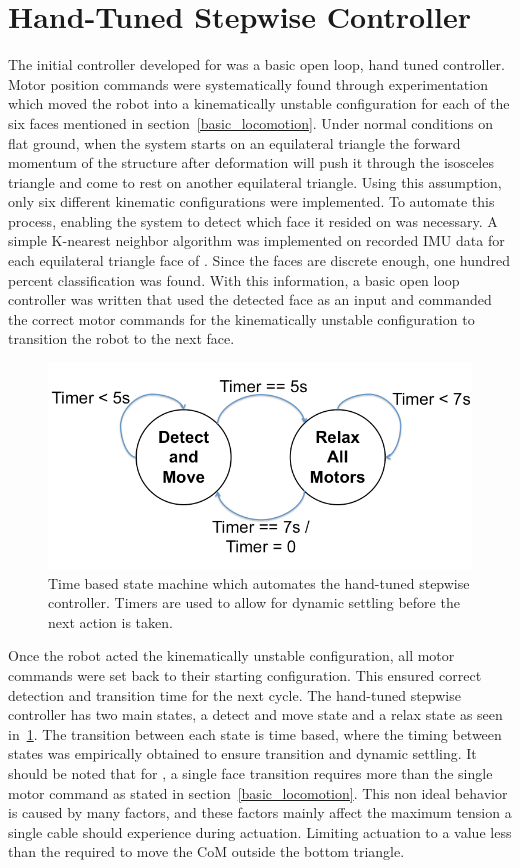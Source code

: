 \section{Hand-Tuned Stepwise Controller}
\label{hand_stepwise}
The initial controller developed for \SB{} was a basic open loop, hand tuned controller.
Motor position commands were systematically found through experimentation which moved the robot into a kinematically unstable configuration for each of the six faces mentioned in section~\ref{basic_locomotion}.
Under normal conditions on flat ground, when the system starts on an equilateral triangle the forward momentum of the structure after deformation will push it through the isosceles triangle and come to rest on another equilateral triangle.
Using this assumption, only six different kinematic configurations were implemented.
To automate this process, enabling the system to detect which face it resided on was necessary.
A simple K-nearest neighbor algorithm was implemented on recorded IMU data for each equilateral triangle face of \SB{}.
Since the faces are discrete enough, one hundred percent classification was found.
With this information, a basic open loop controller was written that used the detected face as an input and commanded the correct motor commands for the kinematically unstable configuration to transition the robot to the next face.

\begin{figure}[thpb]
      \centering
      \includegraphics[width=0.7\columnwidth]{tex/img/Stepwise_state_machine/Slide1_fixed}
      \caption{Time based state machine which automates the hand-tuned stepwise controller. Timers are used to allow for dynamic settling before the next action is taken.}
      \label{fig:stepwise_fsm}
\end{figure}

Once the robot acted the kinematically unstable configuration, all motor commands were set back to their starting configuration.
This ensured correct detection and transition time for the next cycle.
The hand-tuned stepwise controller has two main states, a detect and move state and a relax state as seen in~\ref{fig:stepwise_fsm}.
The transition between each state is time based, where the timing between states was empirically obtained to ensure transition and dynamic settling.
It should be noted that for \SB{}, a single face transition requires more than the single motor command as stated in section~\ref{basic_locomotion}.
This non ideal behavior is caused by many factors, and these factors mainly affect the maximum tension a single cable should experience during actuation.
Limiting actuation to a value less than the required to move the CoM outside the bottom triangle.


